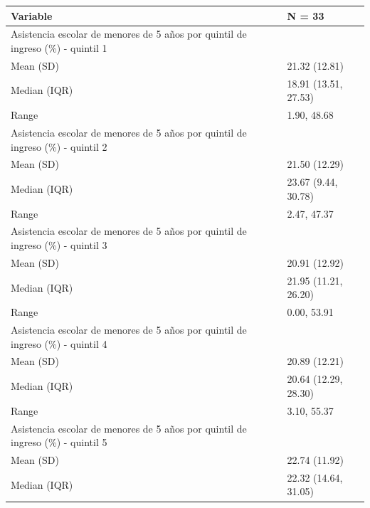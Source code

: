 \begin{table}
\centering\begingroup\fontsize{7}{9}\selectfont

\begin{tabular}{ll}
\toprule
Variable & N = 33\\
\midrule
Asistencia escolar de menores de 5 años por quintil de ingreso (\%) - quintil 1 & \\
\hspace{1em}Mean (SD) & 21.32 (12.81)\\
\hspace{1em}Median (IQR) & 18.91 (13.51, 27.53)\\
\hspace{1em}Range & 1.90, 48.68\\
Asistencia escolar de menores de 5 años por quintil de ingreso (\%) - quintil 2 & \\
\addlinespace
\hspace{1em}Mean (SD) & 21.50 (12.29)\\
\hspace{1em}Median (IQR) & 23.67 (9.44, 30.78)\\
\hspace{1em}Range & 2.47, 47.37\\
Asistencia escolar de menores de 5 años por quintil de ingreso (\%) - quintil 3 & \\
\hspace{1em}Mean (SD) & 20.91 (12.92)\\
\addlinespace
\hspace{1em}Median (IQR) & 21.95 (11.21, 26.20)\\
\hspace{1em}Range & 0.00, 53.91\\
Asistencia escolar de menores de 5 años por quintil de ingreso (\%) - quintil 4 & \\
\hspace{1em}Mean (SD) & 20.89 (12.21)\\
\hspace{1em}Median (IQR) & 20.64 (12.29, 28.30)\\
\addlinespace
\hspace{1em}Range & 3.10, 55.37\\
Asistencia escolar de menores de 5 años por quintil de ingreso (\%) - quintil 5 & \\
\hspace{1em}Mean (SD) & 22.74 (11.92)\\
\hspace{1em}Median (IQR) & 22.32 (14.64, 31.05)\\

\end{tabular}
\end{table}
